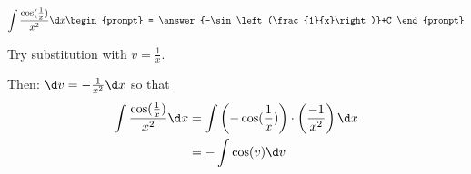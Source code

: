 \documentclass{ximera}
\author{Steven Gubkin\and Nela Lakos \and Bobby Ramsey}
\begin{document}
\begin{exercise}

\[
\int \frac{\cos(\frac{1}{x})}{x^2} \d x \begin{prompt} = \answer{-\sin\left(\frac{1}{x}\right)}+C \end{prompt}
\]
\begin{hint}
	Try substitution with $v=\frac{1}{x}$.
\end{hint}
\begin{hint}
	Then: $\d v=-\frac{1}{x^2}\d x$ so that   
	\begin{align*}
		\int \frac{\cos(\frac{1}{x})}{x^2} \d x &= \int \left(-\cos(\frac{1}{x})\right) \cdot\left(\frac{-1}{x^2}\right)\d x\\
			&=-\int \cos(v) \d v
	\end{align*}

\end{hint}
\end{exercise}
\end{document}
